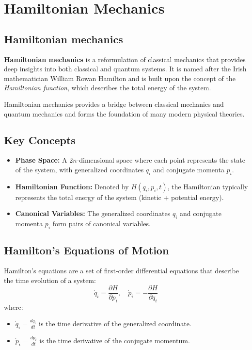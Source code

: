 \chapter{Hamiltonian Mechanics}

\section{Hamiltonian mechanics}
\textbf{Hamiltonian mechanics} is a reformulation of classical mechanics that provides deep insights into both classical and quantum systems. It is named after the Irish mathematician William Rowan Hamilton and is built upon the concept of the \textit{Hamiltonian function}, which describes the total energy of the system.

Hamiltonian mechanics provides a bridge between classical mechanics and quantum mechanics and forms the foundation of many modern physical theories.

\section{Key Concepts}
\begin{itemize}
    \item \textbf{Phase Space:} A 2$n$-dimensional space where each point represents the state of the system, with generalized coordinates $q_i$ and conjugate momenta $p_i$.
    \item \textbf{Hamiltonian Function:} Denoted by $H(q_i, p_i, t)$, the Hamiltonian typically represents the total energy of the system (kinetic + potential energy).
    \item \textbf{Canonical Variables:} The generalized coordinates $q_i$ and conjugate momenta $p_i$ form pairs of canonical variables.
\end{itemize}

\section{Hamilton's Equations of Motion}
Hamilton's equations are a set of first-order differential equations that describe the time evolution of a system:
\[
\dot{q}_i = \frac{\partial H}{\partial p_i}, \quad \dot{p}_i = -\frac{\partial H}{\partial q_i}
\]
where:
\begin{itemize}
    \item $\dot{q}_i = \frac{dq_i}{dt}$ is the time derivative of the generalized coordinate.
    \item $\dot{p}_i = \frac{dp_i}{dt}$ is the time derivative of the conjugate momentum.
\end{itemize}

